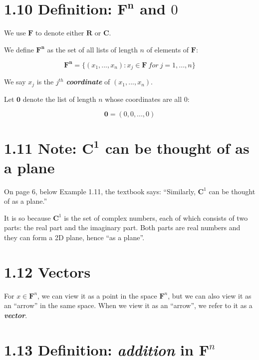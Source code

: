 \documentclass[12pt, letterpaper, oneside]{book}
\begin{document}
\section{1.10 Definition: $\mathbf{F^n}$ and $0$}

We use $\mathbf{F}$ to denote either $\mathbf{R}$ or $\mathbf{C}$.

We define $\mathbf{F^n}$ as the set of all lists of length $n$ of elements of
$\mathbf{F}$:

\[
  \mathbf{F^n} = \{(x_1, ..., x_n): x_j \in \mathbf{F} \ for \ j = 1, ..., n\}
\]

We say $x_j$ is the $j^{th}$ \textbf{\textit{coordinate}} of $(x_1, ..., x_n)$.

Let $\mathbf{0}$ denote the list of length $n$ whose coordinates are all $0$:

\[
  \mathbf{0} = (0, 0, ..., 0)
\]

\section{1.11 Note: $\mathbf{C^1}$ can be thought of as a plane}

On page 6, below Example 1.11, the textbook says: ``Similarly, $\mathbf{C}^1$
can be thought of as a plane.''

It is so because $\mathbf{C}^1$ is the set of complex numbers, each of which
consists of two parts: the real part and the imaginary part. Both parts are real
numbers and they can form a 2D plane, hence ``as a plane''.

\section{1.12 Vectors}

For $x \in \mathbf{F}^n$, we can view it as a point in the space $\mathbf{F}^n$,
but we can also view it as an ``arrow'' in the same space. When we view it as
an ``arrow'', we refer to it as a \textbf{\textit{vector}}.

\section{1.13 Definition: \textit{addition} in $\mathbf{F}^n$}
\end{document}
